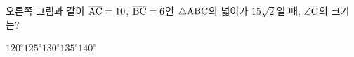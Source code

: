 \noindent\begin{minipage}[t]{0.58\linewidth}\vspace{0pt}\raggedright 오른쪽 그림과 같이 $\overline{\mathrm{AC}}=10$, $\overline{\mathrm{BC}}=6$인 $\triangle\mathrm{ABC}$의 넓이가 $15\sqrt{2}$일 때, $\angle\mathrm{C}$의 크기는? \end{minipage}\hfill\begin{minipage}[t]{0.4\linewidth}\vspace{0pt}\centering \resizebox{\ifdim\width>\linewidth\linewidth\else\width\fi}{!}{}\end{minipage}\par
\begin{choices32}{$120^\circ$}{$125^\circ$}{$130^\circ$}{$135^\circ$}{$140^\circ$}\end{choices32}
